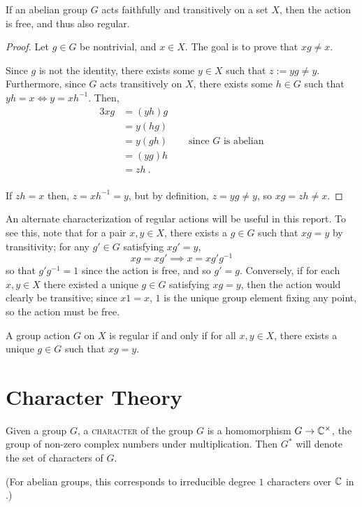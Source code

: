 \documentclass{report}
\begin{document}
    \begin{lem}\label{faithful-transitive-abelian}
      If an abelian group $G$ acts faithfully and transitively on a set $X$,
      then the action is free, and thus also regular. \cite[Section 4.1,
      Exercise 3]{dummit-foote}
    \end{lem}

    \begin{proof}
      Let $g \in G$ be nontrivial, and $x \in X$.
      The goal is to prove that $xg \neq x$.

      Since $g$ is not the identity,
      there exists some $y \in X$ such that $z := yg \neq y$.
      Furthermore, since $G$ acts transitively on $X$,
      there exists some $h \in G$ such that $yh = x \iff y = xh^{-1}$.
      Then,
      \begin{alignat*}{3}
        xg &= (yh) g &\\
        &= y (hg) &\\
        &= y (gh) \quad&\text{ since $G$ is abelian}\\
        &= (yg) h &\\
        &= zh \ .&\\
      \end{alignat*}

      If $zh = x$ then, $z = xh^{-1} = y$,
      but by definition, $z = yg \neq y$,
      so $xg = zh \neq x$.
    \end{proof}

    An alternate characterization of regular actions will be useful in this
    report.  To see this, note that for a pair $x, y \in X$, there exists a $g
    \in G$ such that $xg = y$ by transitivity; for any $g' \in G$ satisfying
    $xg' = y$, 
    $$
      xg = xg' \implies x = x g'g^{-1}
    $$
    so that $g'g^{-1} = 1$ since the action is free, and so $g' = g$.
    Conversely, if for each $x, y \in X$ there existed a unique $g \in G$
    satisfying $xg = y$, then the action would clearly be transitive; since $x 1
    = x$, $1$ is the unique group element fixing any point, so the action must
    be free.

    \begin{lem}\label{regular-unique}
      A group action $G$ on $X$ is regular if and only if
      for all $x, y \in X$, there exists a unique $g \in G$
      such that $xg = y$.
    \end{lem}

  \section{Character Theory}
    \begin{defn}[Characters]\label{character}
      Given a group $G$, a \textsc{character} of the group $G$
      is a homomorphism $G \to \mathbb{C}^\times$,
      the group of non-zero complex numbers under multiplication.
      Then $G^*$ will denote the set of characters of $G$.
      \cite[Chapter 8]{godsil}

      (For abelian groups, this corresponds to irreducible degree $1$ characters
      over $\mathbb{C}$ in \cite[Section 18.3]{dummit-foote}.)
    \end{defn}
\end{document}
